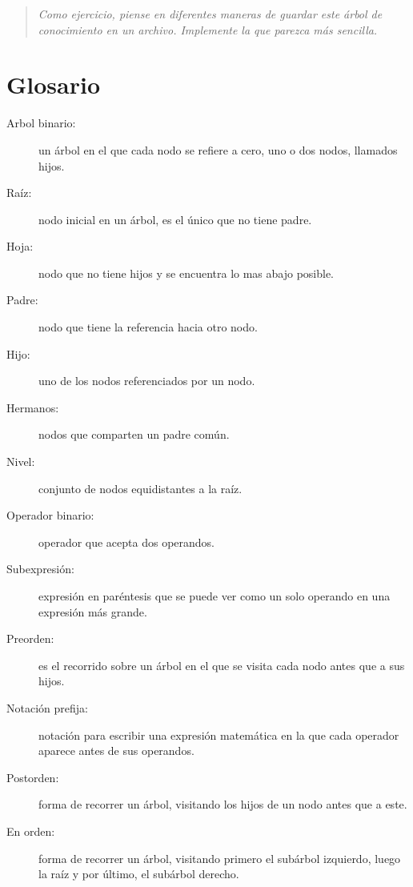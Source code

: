 \begin{quote}
{\em Como ejercicio, piense en diferentes maneras de guardar 
este árbol de conocimiento en un archivo. Implemente la 
que parezca más sencilla.}
\end{quote}


\section{Glosario}

\begin{description}

\item[Arbol binario:]  un árbol en el que cada nodo se refiere a cero, uno
o dos nodos, llamados hijos.

\item[Raíz:]  nodo inicial en un árbol, es el único que no tiene padre.

\item[Hoja:]  nodo que no tiene hijos y se encuentra lo mas abajo posible.

\item[Padre:] nodo que tiene la referencia hacia otro nodo.

\item[Hijo:]  uno de los nodos referenciados por un nodo.

\item[Hermanos:]  nodos que comparten un padre común.

\item[Nivel:]  conjunto de nodos equidistantes a la raíz.

\item[Operador binario:]  operador que acepta dos operandos.

\item[Subexpresión:]   expresión en paréntesis que se puede ver como
un solo operando en una expresión más grande.

\item[Preorden:]  es el recorrido sobre un árbol en el que se visita cada
nodo antes que a sus hijos.

\item[Notación prefija:]  notación para escribir una expresión matemática
en la que cada operador aparece antes de sus operandos.

\item[Postorden:]  forma de recorrer un árbol, visitando los hijos 
de un nodo antes que a este.

\item[En orden:]  forma de recorrer un árbol, visitando primero el 
subárbol izquierdo, luego la raíz y por último, el subárbol derecho.

\end{description}
